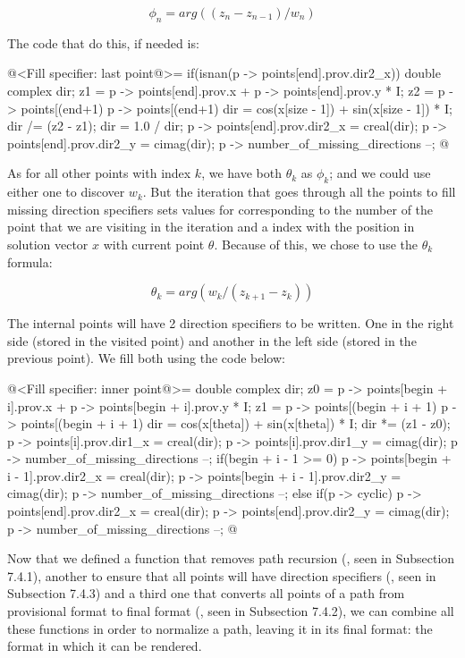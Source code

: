 $$
\phi_n = arg((z_n-z_{n-1})/w_n)
$$

The code that do this, if needed is:

\iniciocodigo
@<Fill specifier: last point@>=
if(isnan(p -> points[end].prov.dir2_x)){
  double complex dir;
  z1 = p -> points[end].prov.x + p -> points[end].prov.y * I;
  z2 = p -> points[(end+1) %
       p -> points[(end+1) %
  dir = cos(x[size - 1]) + sin(x[size - 1]) * I;
  dir /= (z2 - z1);
  dir = 1.0 / dir;
  p -> points[end].prov.dir2_x = creal(dir);
  p -> points[end].prov.dir2_y = cimag(dir);
  p -> number_of_missing_directions --;
}
@
\fimcodigo

As for all other points with index $k$, we have both $\theta_k$ as
$\phi_k$; and we could use either one to discover $w_k$. But the
iteration that goes through all the points to fill missing direction
specifiers sets values for  corresponding to the number
of the point that we are visiting in the iteration and
a  index with the position in solution vector $x$
with current point $\theta$. Because of this, we chose to use the
$\theta_k$ formula:

$$
\theta_k = arg(w_k/(z_{k+1}-z_k))
$$

The internal points will have 2 direction specifiers to be
written. One in the right side (stored in the visited point) and
another in the left side (stored in the previous point). We fill both
using the code below:

\iniciocodigo
@<Fill specifier: inner point@>=
{
  double complex dir;
  z0 = p -> points[begin + i].prov.x + p -> points[begin + i].prov.y * I;
  z1 = p -> points[(begin + i + 1) %
       p -> points[(begin + i + 1) %
  dir = cos(x[theta]) + sin(x[theta]) * I;
  dir *= (z1 - z0);
  p -> points[i].prov.dir1_x = creal(dir);
  p -> points[i].prov.dir1_y = cimag(dir);
  p -> number_of_missing_directions --;
  if(begin + i - 1 >= 0){
    p -> points[begin + i - 1].prov.dir2_x = creal(dir);
    p -> points[begin + i - 1].prov.dir2_y = cimag(dir);
    p -> number_of_missing_directions --;
  }
  else if(p -> cyclic){
    p -> points[end].prov.dir2_x = creal(dir);
    p -> points[end].prov.dir2_y = cimag(dir);
    p -> number_of_missing_directions --;
  }
}
@
\fimcodigo


Now that we defined a function that removes path recursion
(, seen in Subsection 7.4.1),
another to ensure that all points will have direction specifiers
(, seen in Subsection 7.4.3) and
a third one that converts all points of a path from provisional format
to final format (, seen in Subsection
7.4.2), we can combine all these functions in order to normalize a
path, leaving it in its final format: the format in which it can
be rendered.

